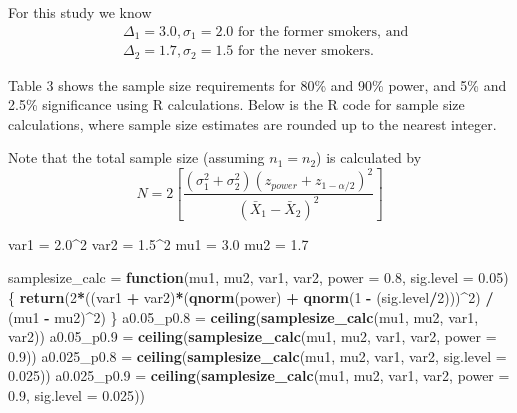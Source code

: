 \documentclass[]{article}
\newenvironment{Shaded}{\begin{snugshade}}{\end{snugshade}}
\newcommand{\KeywordTok}[1]{\textcolor[rgb]{0.13,0.29,0.53}{\textbf{#1}}}
\newcommand{\DataTypeTok}[1]{\textcolor[rgb]{0.13,0.29,0.53}{#1}}
\newcommand{\DecValTok}[1]{\textcolor[rgb]{0.00,0.00,0.81}{#1}}
\newcommand{\FloatTok}[1]{\textcolor[rgb]{0.00,0.00,0.81}{#1}}
\newcommand{\StringTok}[1]{\textcolor[rgb]{0.31,0.60,0.02}{#1}}
\newcommand{\ControlFlowTok}[1]{\textcolor[rgb]{0.13,0.29,0.53}{\textbf{#1}}}
\newcommand{\OperatorTok}[1]{\textcolor[rgb]{0.81,0.36,0.00}{\textbf{#1}}}
\newcommand{\NormalTok}[1]{#1}
\begin{document}
For this study we know \[
\begin{aligned}
&\Delta_1 = 3.0,\sigma_1 = 2.0 \text{ for the former smokers, and} \\
&\Delta_2 = 1.7, \sigma_2 = 1.5 \text{ for the never smokers.}
\end{aligned}
\]

Table 3 shows the sample size requirements for 80\% and 90\% power, and
5\% and 2.5\% significance using R calculations. Below is the R code for
sample size calculations, where sample size estimates are rounded up to
the nearest integer.

Note that the total sample size (assuming \(n_1=n_2\)) is calculated by
\[N = 2[ \frac{(\sigma_1^2 + \sigma_2^2)(z_{power} + z_{1-\alpha/2})^2}{(\bar{X}_1 - \bar{X}_2)^2} ] \]

\begin{Shaded}
\begin{Highlighting}[]
\NormalTok{var1 =}\StringTok{ }\FloatTok{2.0}\OperatorTok{^}\DecValTok{2}
\NormalTok{var2 =}\StringTok{ }\FloatTok{1.5}\OperatorTok{^}\DecValTok{2}
\NormalTok{mu1 =}\StringTok{ }\FloatTok{3.0}
\NormalTok{mu2 =}\StringTok{ }\FloatTok{1.7}

\NormalTok{samplesize_calc =}\StringTok{ }\ControlFlowTok{function}\NormalTok{(mu1, mu2, var1, var2, }\DataTypeTok{power =} \FloatTok{0.8}\NormalTok{, }\DataTypeTok{sig.level =} \FloatTok{0.05}\NormalTok{)\{}
  \KeywordTok{return}\NormalTok{(}\DecValTok{2}\OperatorTok{*}\NormalTok{((var1 }\OperatorTok{+}\StringTok{ }\NormalTok{var2)}\OperatorTok{*}\NormalTok{(}\KeywordTok{qnorm}\NormalTok{(power) }\OperatorTok{+}\StringTok{ }\KeywordTok{qnorm}\NormalTok{(}\DecValTok{1} \OperatorTok{-}\StringTok{ }\NormalTok{(sig.level}\OperatorTok{/}\DecValTok{2}\NormalTok{)))}\OperatorTok{^}\DecValTok{2}\NormalTok{) }\OperatorTok{/}\StringTok{ }\NormalTok{(mu1 }\OperatorTok{-}\StringTok{ }\NormalTok{mu2)}\OperatorTok{^}\DecValTok{2}\NormalTok{)}
\NormalTok{\}}
\NormalTok{a0.05_p0.}\DecValTok{8}\NormalTok{ =}\StringTok{ }\KeywordTok{ceiling}\NormalTok{(}\KeywordTok{samplesize_calc}\NormalTok{(mu1, mu2, var1, var2))}
\NormalTok{a0.05_p0.}\DecValTok{9}\NormalTok{ =}\StringTok{ }\KeywordTok{ceiling}\NormalTok{(}\KeywordTok{samplesize_calc}\NormalTok{(mu1, mu2, var1, var2, }\DataTypeTok{power =} \FloatTok{0.9}\NormalTok{))}
\NormalTok{a0.025_p0.}\DecValTok{8}\NormalTok{ =}\StringTok{ }\KeywordTok{ceiling}\NormalTok{(}\KeywordTok{samplesize_calc}\NormalTok{(mu1, mu2, var1, var2, }\DataTypeTok{sig.level =} \FloatTok{0.025}\NormalTok{))}
\NormalTok{a0.025_p0.}\DecValTok{9}\NormalTok{ =}\StringTok{ }\KeywordTok{ceiling}\NormalTok{(}\KeywordTok{samplesize_calc}\NormalTok{(mu1, mu2, var1, var2, }\DataTypeTok{power =} \FloatTok{0.9}\NormalTok{, }\DataTypeTok{sig.level =} \FloatTok{0.025}\NormalTok{))}
\end{Highlighting}
\end{Shaded}
\end{document}
